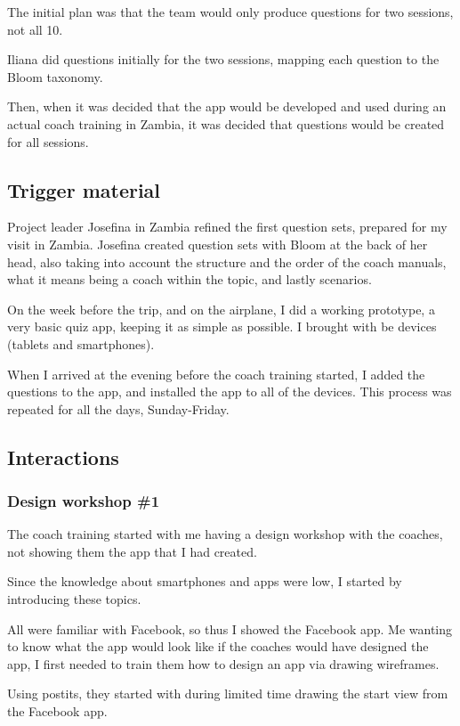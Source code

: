 The initial plan was that the team would only produce questions for two sessions, not all 10.

Iliana did questions initially for the two sessions, mapping each question to the Bloom taxonomy.

Then, when it was decided that the app would be developed and used during an actual coach training in Zambia, it was decided that questions would be created for all sessions.

\subsection*{Trigger material}
Project leader Josefina in Zambia refined the first question sets, prepared for my visit in Zambia. Josefina created question sets with Bloom at the back of her head, also taking into account the structure and the order of the coach manuals, what it means being a coach within the topic, and lastly scenarios.

On the week before the trip, and on the airplane, I did a working prototype, a very basic quiz app, keeping it as simple as possible. I brought with be devices (tablets and smartphones).

When I arrived at the evening before the coach training started, I added the questions to the app, and installed the app to all of the devices. This process was repeated for all the days, Sunday-Friday.

\subsection*{Interactions}

\subsubsection{Design workshop \#1}
The coach training started with me having a design workshop with the coaches, not showing them the app that I had created.

Since the knowledge about smartphones and apps were low, I started by introducing these topics.

All were familiar with Facebook, so thus I showed the Facebook app. Me wanting to know what the app would look like if the coaches would have designed the app, I first needed to train them how to design an app via drawing wireframes.

Using postits, they started with during limited time drawing the start view from the Facebook app.

